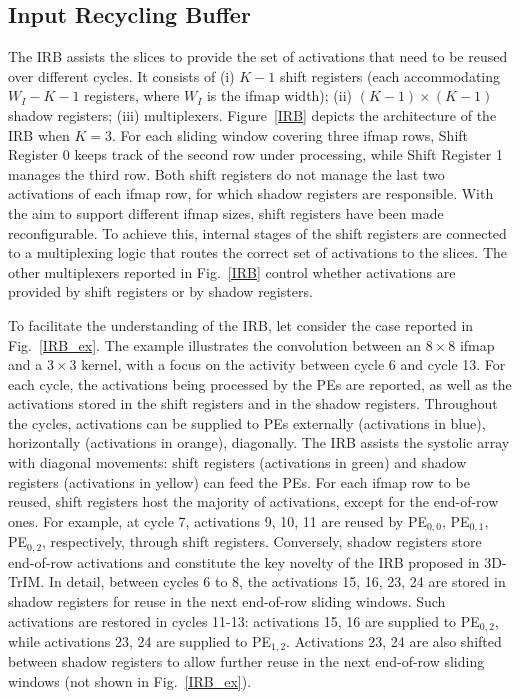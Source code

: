 \subsection{Input Recycling Buffer}


The IRB assists the slices to provide the set of activations that need to be reused over different cycles. It consists of (i) $K-1$ shift registers (each accommodating $W_I-K-1$ registers, where $W_I$ is the ifmap width); (ii) $(K-1) \times (K-1)$ shadow registers; (iii) multiplexers. Figure~\ref{IRB} depicts the architecture of the IRB when $K=3$. For each sliding window covering three ifmap rows, Shift Register 0 keeps track of the second row under processing, while Shift Register 1 manages the third row. Both shift registers do not manage the last two activations of each ifmap row, for which shadow registers are responsible.
With the aim to support different ifmap sizes, shift registers have been made reconfigurable. To achieve this, internal stages of the shift registers are connected to a multiplexing logic that routes the correct set of activations to the slices. The other multiplexers reported in Fig.~\ref{IRB} control whether activations are provided by shift registers or by shadow registers.


To facilitate the understanding of the IRB, let consider the case reported in Fig.~\ref{IRB_ex}. The example  illustrates the convolution between an $8 \times 8$ ifmap and a $3 \times 3$ kernel, with a focus on the activity between cycle 6 and cycle 13. For each cycle, the activations being processed by the PEs are reported, as well as the activations stored in the shift registers and in the shadow registers. Throughout the cycles, activations can be supplied to PEs externally (activations in blue), horizontally (activations in orange), diagonally. The IRB assists the systolic array with diagonal movements: shift registers (activations in green) and shadow registers (activations in yellow) can feed the PEs. For each ifmap row to be reused, shift registers host the majority of activations, except for the end-of-row ones. For example, at cycle 7, activations 9, 10, 11 are reused by PE$_{0,0}$, PE$_{0,1}$, PE$_{0,2}$, respectively, through shift registers. Conversely, shadow registers store end-of-row activations and constitute the key novelty of the IRB proposed in 3D-TrIM. In detail, between cycles 6 to 8, the activations 15, 16, 23, 24 are stored in shadow registers for reuse in the next end-of-row sliding windows. Such activations are restored in cycles 11-13: activations 15, 16 are supplied to PE$_{0,2}$, while activations 23, 24 are supplied to PE$_{1,2}$. Activations 23, 24 are also shifted between shadow registers to allow further reuse in the next end-of-row sliding windows (not shown in Fig.~\ref{IRB_ex}).

